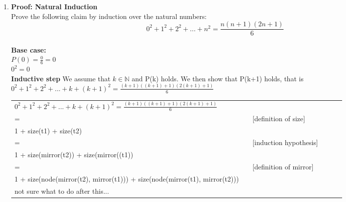\documentclass{article}
\begin{document}
\begin{enumerate}[\bf I.]
\item \textbf{Proof: Natural Induction} \\[8pt]
Prove the following claim by induction over the natural numbers:
\[\displaystyle 0^2 + 1^2 + 2^2 + ... + n^2 = \frac{n( n + 1 )( 2n + 1 )}{6}\] \\
\textbf{Base case:}\\
$P(0) = \frac{0} {6} = 0 $ \\
$0^2 = 0$ \\
\textbf{Inductive step} We assume that $k \in \mathbb{N}$ and P(k) holds. We then show that P(k+1) holds, that is $0^2 + 1^2 + 2^2 + ... + k + (k + 1)^2 = \frac{(k+1)( (k+1) + 1 )( 2(k+1) + 1 )}{6}$
\\
\begin{tabular}{l ll lll}
     $0^2 + 1^2 + 2^2 + ... + k + (k + 1)^2 = \frac{(k+1)( (k+1) + 1 )( 2(k+1) + 1 )}{6}$  &    &  \\
     = &   & [definition of size] \\
     1 + size(t1) + size(t2) & & \\
     = &   & [induction hypothesis] \\
     1 + size(mirror(t2)) + size(mirror((t1)) & & \\
     = & & [definition of mirror] \\
     1 + size(node(mirror(t2), mirror(t1))) + size(node(mirror(t1), mirror(t2))) & & \\
     not sure what to do after this... \\
\end{tabular} \\


\end{enumerate}
\end{document}
